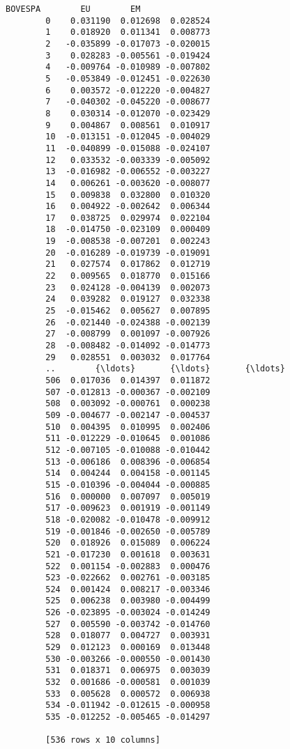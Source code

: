 \documentclass[11pt]{article}
\begin{document}
\begin{Verbatim}[commandchars=\\\{\}]
              BOVESPA        EU        EM  
        0    0.031190  0.012698  0.028524  
        1    0.018920  0.011341  0.008773  
        2   -0.035899 -0.017073 -0.020015  
        3    0.028283 -0.005561 -0.019424  
        4   -0.009764 -0.010989 -0.007802  
        5   -0.053849 -0.012451 -0.022630  
        6    0.003572 -0.012220 -0.004827  
        7   -0.040302 -0.045220 -0.008677  
        8    0.030314 -0.012070 -0.023429  
        9    0.004867  0.008561  0.010917  
        10  -0.013151 -0.012045 -0.004029  
        11  -0.040899 -0.015088 -0.024107  
        12   0.033532 -0.003339 -0.005092  
        13  -0.016982 -0.006552 -0.003227  
        14   0.006261 -0.003620 -0.008077  
        15   0.009838  0.032800  0.010320  
        16   0.004922 -0.002642  0.006344  
        17   0.038725  0.029974  0.022104  
        18  -0.014750 -0.023109  0.000409  
        19  -0.008538 -0.007201  0.002243  
        20  -0.016289 -0.019739 -0.019091  
        21   0.027574  0.017862  0.012719  
        22   0.009565  0.018770  0.015166  
        23   0.024128 -0.004139  0.002073  
        24   0.039282  0.019127  0.032338  
        25  -0.015462  0.005627  0.007895  
        26  -0.021440 -0.024388 -0.002139  
        27  -0.008799  0.001097 -0.007926  
        28  -0.008482 -0.014092 -0.014773  
        29   0.028551  0.003032  0.017764  
        ..        {\ldots}       {\ldots}       {\ldots}  
        506  0.017036  0.014397  0.011872  
        507 -0.012813 -0.000367 -0.002109  
        508  0.003092 -0.000761  0.000238  
        509 -0.004677 -0.002147 -0.004537  
        510  0.004395  0.010995  0.002406  
        511 -0.012229 -0.010645  0.001086  
        512 -0.007105 -0.010088 -0.010442  
        513 -0.006186  0.008396 -0.006854  
        514  0.004244  0.004158 -0.001145  
        515 -0.010396 -0.004044 -0.000885  
        516  0.000000  0.007097  0.005019  
        517 -0.009623  0.001919 -0.001149  
        518 -0.020082 -0.010478 -0.009912  
        519 -0.001846 -0.002650 -0.005789  
        520  0.018926  0.015089  0.006224  
        521 -0.017230  0.001618  0.003631  
        522  0.001154 -0.002883  0.000476  
        523 -0.022662  0.002761 -0.003185  
        524  0.001424  0.008217 -0.003346  
        525  0.006238  0.003980 -0.004499  
        526 -0.023895 -0.003024 -0.014249  
        527  0.005590 -0.003742 -0.014760  
        528  0.018077  0.004727  0.003931  
        529  0.012123  0.000169  0.013448  
        530 -0.003266 -0.000550 -0.001430  
        531  0.018371  0.006975  0.003039  
        532  0.001686 -0.000581  0.001039  
        533  0.005628  0.000572  0.006938  
        534 -0.011942 -0.012615 -0.000958  
        535 -0.012252 -0.005465 -0.014297  
        
        [536 rows x 10 columns]
\end{Verbatim}
            
\end{document}
